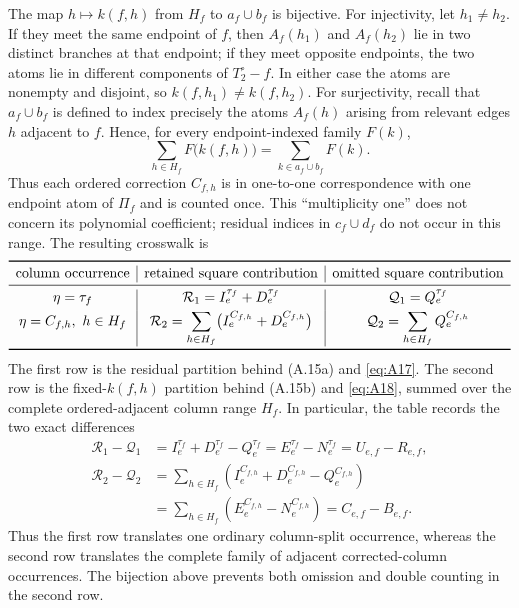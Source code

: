 \documentclass[11pt]{article}
\begin{document}
The map $h\mapsto k(f,h)$ from $H_f$ to $a_f\cup b_f$ is bijective.
For injectivity, let $h_1\ne h_2$.  If they meet the same endpoint of $f$,
then $A_f(h_1)$ and $A_f(h_2)$ lie in two distinct branches at that
endpoint; if they meet opposite endpoints, the two atoms lie in different
components of $T_2^\circ-f$.  In either case the atoms are nonempty and
disjoint, so $k(f,h_1)\ne k(f,h_2)$.  For surjectivity, recall that
$a_f\cup b_f$ is defined to index precisely the atoms $A_f(h)$ arising from
relevant edges $h$ adjacent to $f$.  Hence, for every endpoint-indexed
family $F(k)$,
\[
 \sum_{h\in H_f}F\bigl(k(f,h)\bigr)
 =\sum_{k\in a_f\cup b_f}F(k).
\]
Thus each ordered correction $C_{f,h}$ is in one-to-one correspondence with
one endpoint atom of $\Pi_f$ and is counted once.  This ``multiplicity one''
does not concern its polynomial coefficient; residual indices in
$c_f\cup d_f$ do not occur in this range.  The resulting crosswalk is
\[
\begin{array}{c|c|c}
\toprule
\text{column occurrence}
&\text{retained square contribution}
&\text{omitted square contribution}\\
\midrule
\eta=\tau_f
&\mathcal R_1=I_e^{\tau_f}+D_e^{\tau_f}
&\mathcal Q_1=Q_e^{\tau_f}\\[1mm]
\eta=C_{f,h},\ h\in H_f
&\displaystyle
 \mathcal R_2=\sum_{h\in H_f}
 \bigl(I_e^{C_{f,h}}+D_e^{C_{f,h}}\bigr)
&\displaystyle
 \mathcal Q_2=\sum_{h\in H_f}Q_e^{C_{f,h}}
\\
\bottomrule
\end{array}
\]
The first row is the residual partition behind (A.15a) and
\eqref{eq:A17}.  The second row is the fixed-$k(f,h)$ partition behind
(A.15b) and \eqref{eq:A18}, summed over the complete ordered-adjacent
column range $H_f$.  In particular, the table records the two exact
differences
\[
\begin{aligned}
\mathcal R_1-\mathcal Q_1
 &=I_e^{\tau_f}+D_e^{\tau_f}-Q_e^{\tau_f}
  =E_e^{\tau_f}-N_e^{\tau_f}
  =U_{e,f}-R_{e,f},\\
\mathcal R_2-\mathcal Q_2
 &=\sum_{h\in H_f}
   \left(I_e^{C_{f,h}}+D_e^{C_{f,h}}-Q_e^{C_{f,h}}\right)\\
 &=\sum_{h\in H_f}
   \left(E_e^{C_{f,h}}-N_e^{C_{f,h}}\right)
  =C_{e,f}-B_{e,f}.
\end{aligned}
\]
Thus the first row translates one ordinary column-split occurrence, whereas
the second row translates the complete family of adjacent corrected-column
occurrences.  The bijection above prevents both omission and double counting
in the second row.
\end{document}
